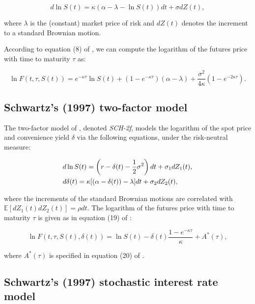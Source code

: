 \documentclass{article}
\begin{document}
\begin{equation*}
    d \ln S(t) = \kappa \left( \alpha - \lambda - \ln S(t)  \right)dt + \sigma dZ(t),
\end{equation*}

\noindent where $\lambda$ is the (constant) market price of risk and $dZ(t)$ denotes the  increment to a standard Brownian motion. 

According to equation (8) of \cite{schwartz97}, we can compute the logarithm of the futures price with time to maturity $\tau$ as:

\begin{equation*}
    \ln{F(t, \tau, S(t))} = e^{-\kappa \tau } \ln S(t) + (1 - e^{-\kappa \tau }) (\alpha - \lambda) + \frac{\sigma^2}{4 \kappa} (1 - e^{-2 \kappa \tau}).
\end{equation*}



\subsection{Schwartz's (1997) two-factor model}

The two-factor model of \cite{schwartz97}, denoted \textit{SCH-2f}, models the logarithm of the spot price and convenience yield $\delta$ via the following equations, under the risk-neutral measure:

\begin{align*}
    &d \ln S(t) =  \left(r - \delta(t) - \frac{1}{2} \sigma^2  \right) dt + \sigma_1 dZ_{1}(t), \\ \notag
    &d\delta(t) = \kappa [\left(\alpha - \delta(t) \right) - \lambda] dt + \sigma_2 dZ_{2}(t),
\end{align*}

\noindent where the increments of the standard Brownian motions are correlated with $ \mathbb{E}[dZ_{1}(t) dZ_{2}(t)] = \rho dt$. The logarithm of the futures price with time to maturity $\tau$ is given as in equation (19) of \cite{schwartz97}:

\begin{equation*}
    \ln{F(t,\tau, S(t), \delta(t))} =  \ln S(t) - \delta(t) \frac{1-e^{-\kappa \tau}}{ \kappa } + A^*(\tau),
\end{equation*}

\noindent where $A^*(\tau)$ is specified in equation (20) of \cite{schwartz97}.  

\subsection{Schwartz's (1997) stochastic interest rate model}
\end{document}
